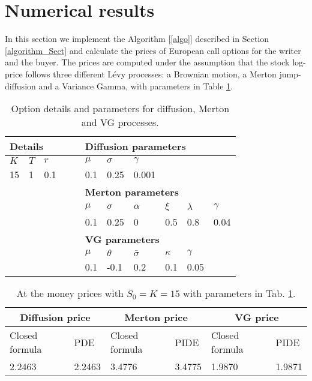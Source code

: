 \section{Numerical results}\label{numerical} 


In this section we implement the Algorithm [\ref{algo}] described in Section \ref{algorithm_Sect} and calculate the prices of European call options for the writer and the buyer.
The prices are computed under the assumption that the stock log-price follows three different L\'evy processes: a Brownian motion, a Merton jump-diffusion and a Variance Gamma, with
parameters in Table \ref{tab:parameters}.
\begin{table}[ht]
\centering
 \begin{tabular}[t]{*{11}l}
 \toprule
  \multicolumn{5}{l}{\textbf{Details}} & \multicolumn{6}{l}{\textbf{Diffusion parameters}} \\
  \midrule
  $K$ & $T$ & $r$ & & & $\mu$ & $\sigma$ & $\gamma$ \\
  15 & 1 & 0.1 & & & 0.1 & 0.25 & 0.001 \\
  \toprule
  \multicolumn{5}{l}{} & \multicolumn{6}{l}{\textbf{Merton parameters}} \\
  \midrule
  & & & & & $\mu$ & $\sigma$ & $\alpha$ &$\xi$ & $\lambda$ & $\gamma$\\
  & & & & & 0.1 & 0.25 & 0 & 0.5 & 0.8 & 0.04\\
  \toprule
  \multicolumn{5}{l}{} & \multicolumn{6}{l}{\textbf{VG parameters}} \\
  \midrule
  & & & & & $\mu$ & $\theta$ & $\bar \sigma$ &$\kappa$ & $\gamma$ \\
  & & & & & 0.1 & -0.1 & 0.2 & 0.1 & 0.05 \\
\bottomrule
\end{tabular}
  \caption{Option details and parameters for diffusion, Merton and VG processes.}
  \label{tab:parameters}
\end{table}

\begin{table}[ht]
\centering
\begin{tabular}[t]{llllll}
\toprule
  \multicolumn{2}{c}{\textbf{Diffusion price}} &  \multicolumn{2}{c}{\textbf{Merton price}} &  \multicolumn{2}{c}{\textbf{VG price}} \\
\midrule
Closed formula & PDE & Closed formula & PIDE & Closed formula & PIDE\\
2.2463 & 2.2463 & 3.4776 & 3.4775 & 1.9870 & 1.9871\\
\bottomrule
\end{tabular}
\caption{At the money prices with $S_0=K=15$ with parameters in Tab. \ref{tab:parameters}.}
\label{tab:ATM_price}
\end{table}%

